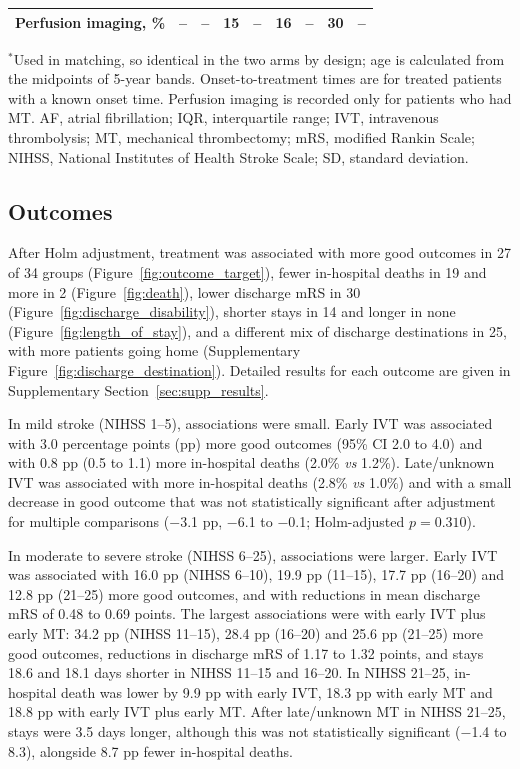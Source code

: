 \begin{table}[H]
{\begin{tabular}{lrrrrrrrr}
Perfusion imaging, \% & -- & -- & 15 & -- & 16 & -- & 30 & -- \\
\bottomrule
\end{tabular}}
\par\smallskip
{\footnotesize\raggedright $^{*}$Used in matching, so identical in the two arms by design; age is calculated from the midpoints of 5-year bands. Onset-to-treatment times are for treated patients with a known onset time. Perfusion imaging is recorded only for patients who had MT. AF, atrial fibrillation; IQR, interquartile range; IVT, intravenous thrombolysis; MT, mechanical thrombectomy; mRS, modified Rankin Scale; NIHSS, National Institutes of Health Stroke Scale; SD, standard deviation.\par}
\end{table}

\subsection{Outcomes}

After Holm adjustment, treatment was associated with more good outcomes in 27 of 34 groups (Figure~\ref{fig:outcome_target}), fewer in-hospital deaths in 19 and more in 2 (Figure~\ref{fig:death}), lower discharge mRS in 30 (Figure~\ref{fig:discharge_disability}), shorter stays in 14 and longer in none (Figure~\ref{fig:length_of_stay}), and a different mix of discharge destinations in 25, with more patients going home (Supplementary Figure~\ref{fig:discharge_destination}). Detailed results for each outcome are given in Supplementary Section~\ref{sec:supp_results}.

In mild stroke (NIHSS 1--5), associations were small. Early IVT was associated with 3.0 percentage points (pp) more good outcomes (95\% CI 2.0 to 4.0) and with 0.8 pp (0.5 to 1.1) more in-hospital deaths (2.0\% \textit{vs} 1.2\%). Late/unknown IVT was associated with more in-hospital deaths (2.8\% \textit{vs} 1.0\%) and with a small decrease in good outcome that was not statistically significant after adjustment for multiple comparisons ($-$3.1 pp, $-$6.1 to $-$0.1; Holm-adjusted $p = 0.310$).

In moderate to severe stroke (NIHSS 6--25), associations were larger. Early IVT was associated with 16.0 pp (NIHSS 6--10), 19.9 pp (11--15), 17.7 pp (16--20) and 12.8 pp (21--25) more good outcomes, and with reductions in mean discharge mRS of 0.48 to 0.69 points. The largest associations were with early IVT plus early MT: 34.2 pp (NIHSS 11--15), 28.4 pp (16--20) and 25.6 pp (21--25) more good outcomes, reductions in discharge mRS of 1.17 to 1.32 points, and stays 18.6 and 18.1 days shorter in NIHSS 11--15 and 16--20. In NIHSS 21--25, in-hospital death was lower by 9.9 pp with early IVT, 18.3 pp with early MT and 18.8 pp with early IVT plus early MT. After late/unknown MT in NIHSS 21--25, stays were 3.5 days longer, although this was not statistically significant ($-$1.4 to 8.3), alongside 8.7 pp fewer in-hospital deaths.

